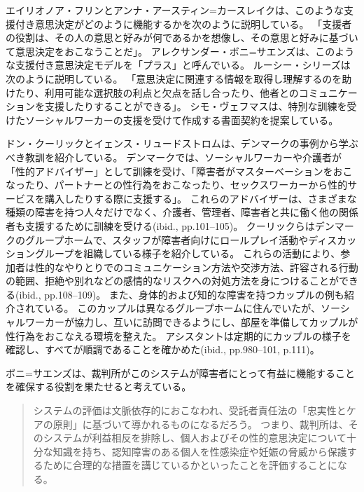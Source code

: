 \documentclass[paper=a4,book,openany]{jlreq}
\begin{document}
エイリオノア・フリンとアンナ・アースティン=カースレイクは、このような支援付き意思決定がどのように機能するかを次のように説明している。
「支援者の役割は、その人の意思と好みが何であるかを想像し、その意思と好みに基づいて意思決定をおこなうことだ」\citep[pp.81--104]{flynn14:_legis_person}。
アレクサンダー・ボニ=サエンズは、このような支援付き意思決定モデルを「プラス」と呼んでいる\citep[p.1234]{boni-saenz15:_sexual_incap}。
ルーシー・シリーズは次のように説明している。
「意思決定に関連する情報を取得し理解するのを助けたり、利用可能な選択肢の利点と欠点を話し合ったり、他者とのコミュニケーションを支援したりすることができる」\citep{series15:_relat_auton_legal_capac}。
シモ・ヴェフマスは、特別な訓練を受けたソーシャルワーカーの支援を受けて作成する書面契約を提案している\citep[p.527]{vehmas19:_person_profoun_intel_disab_their_right_sex}。

ドン・クーリックとイェンス・リュードストロムは、デンマークの事例から学ぶべき教訓を紹介している。
デンマークでは、ソーシャルワーカーや介護者が「性的アドバイザー」として訓練を受け、「障害者がマスターベーションをおこなったり、パートナーとの性行為をおこなったり、セックスワーカーから性的サービスを購入したりする際に支援する」\citep[p.18]{kulick15:_lonel_its_oppos}。
これらのアドバイザーは、さまざまな種類の障害を持つ人々だけでなく、介護者、管理者、障害者と共に働く他の関係者も支援するために訓練を受ける(ibid., pp.101--105)。
クーリックらはデンマークのグループホームで、スタッフが障害者向けにロールプレイ活動やディスカッショングループを組織している様子を紹介している。
これらの活動により、参加者は性的なやりとりでのコミュニケーション方法や交渉方法、許容される行動の範囲、拒絶や別れなどの感情的なリスクへの対処方法を身につけることができる(ibid., pp.108--109)。
また、身体的および知的な障害を持つカップルの例も紹介されている。
このカップルは異なるグループホームに住んでいたが、ソーシャルワーカーが協力し、互いに訪問できるようにし、部屋を準備してカップルが性行為をおこなえる環境を整えた。
アシスタントは定期的にカップルの様子を確認し、すべてが順調であることを確かめた(ibid., pp.980--101, p.111)。

ボニ=サエンズは、裁判所がこのシステムが障害者にとって有益に機能することを確保する役割を果たせると考えている。

\begin{quote}
システムの評価は文脈依存的におこなわれ、受託者責任法の「忠実性とケアの原則」に基づいて導かれるものになるだろう。
つまり、裁判所は、そのシステムが利益相反を排除し、個人およびその性的意思決定について十分な知識を持ち、認知障害のある個人を性感染症や妊娠の脅威から保護するために合理的な措置を講じているかといったことを評価することになる。
\citep[p.1234]{boni-saenz15:_sexual_incap}
\end{quote}
\end{document}
